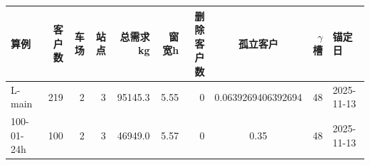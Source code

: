 \begin{tabular}{@{}lrrrrrrcrl@{}}
\toprule
算例 & 客户数 & 车场 & 站点 & 总需求kg & 窗宽h & 删除客户数 & 孤立客户 & $\gamma$槽 & 锚定日\\
\midrule
L-main & 219 & 2 & 3 & 95145.3 & 5.55 & 0 & 0.0639269406392694 & 48 & 2025-11-13\\
100-01-24h & 100 & 2 & 3 & 46949.0 & 5.57 & 0 & 0.35 & 48 & 2025-11-13\\
\bottomrule
\end{tabular}
